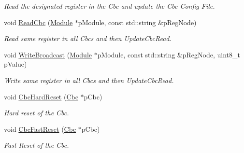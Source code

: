 \begin{DoxyCompactItemize}
\begin{DoxyCompactList}\small\item\em Read the designated register in the Cbc and update the Cbc Config File. \end{DoxyCompactList}\item 
void \hyperlink{class_ph2___hw_interface_1_1_cbc_interface_a247b9d4df6f8f85d43d383124994d88a}{Read\-Cbc} (\hyperlink{class_ph2___hw_description_1_1_module}{Module} $\ast$p\-Module, const std\-::string \&p\-Reg\-Node)
\begin{DoxyCompactList}\small\item\em Read same register in all Cbcs and then Update\-Cbc\-Read. \end{DoxyCompactList}\item 
void \hyperlink{class_ph2___hw_interface_1_1_cbc_interface_af4a7fb33df95b0052bf5046910676aec}{Write\-Broadcast} (\hyperlink{class_ph2___hw_description_1_1_module}{Module} $\ast$p\-Module, const std\-::string \&p\-Reg\-Node, uint8\-\_\-t p\-Value)
\begin{DoxyCompactList}\small\item\em Write same register in all Cbcs and then Update\-Cbc\-Read. \end{DoxyCompactList}\item 
void \hyperlink{class_ph2___hw_interface_1_1_cbc_interface_a0e9a7f5c0a444cb8ca14f3a90cd9e759}{Cbc\-Hard\-Reset} (\hyperlink{class_ph2___hw_description_1_1_cbc}{Cbc} $\ast$p\-Cbc)
\begin{DoxyCompactList}\small\item\em Hard reset of the Cbc. \end{DoxyCompactList}\item 
void \hyperlink{class_ph2___hw_interface_1_1_cbc_interface_ae2166f5bd24481d88bdd015d1db08051}{Cbc\-Fast\-Reset} (\hyperlink{class_ph2___hw_description_1_1_cbc}{Cbc} $\ast$p\-Cbc)
\begin{DoxyCompactList}\small\item\em Fast Reset of the Cbc. \end{DoxyCompactList}\end{DoxyCompactItemize}
